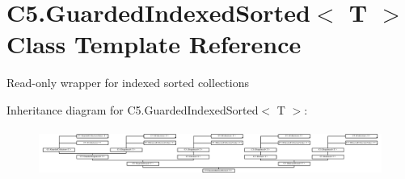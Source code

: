 \hypertarget{class_c5_1_1_guarded_indexed_sorted}{}\section{C5.\+Guarded\+Indexed\+Sorted$<$ T $>$ Class Template Reference}
\label{class_c5_1_1_guarded_indexed_sorted}


Read-\/only wrapper for indexed sorted collections  


Inheritance diagram for C5.\+Guarded\+Indexed\+Sorted$<$ T $>$\+:\begin{figure}[H]
\begin{center}
\leavevmode
\includegraphics[height=1.577465cm]{class_c5_1_1_guarded_indexed_sorted}
\end{center}
\end{figure}
